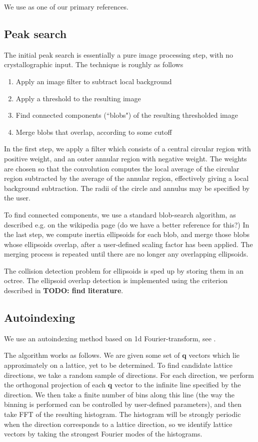 \documentclass[11pt,a4paper]{article}
\def\v#1{\bm{{#1}}}
\def\q{{\v{q}}}
\begin{document}
We use \cite{BuGG16} as one of our primary references.


\subsection{Peak search} \label{peak-search}

The initial peak search is essentially a pure image processing step, with no crystallographic
input. The technique is roughly as follows
\begin{enumerate}
  \item Apply an image filter to subtract local background
  \item Apply a threshold to the resulting image
  \item Find connected components (``blobs") of the resulting thresholded image
  \item Merge blobs that overlap, according to some cutoff
\end{enumerate}

In the first step, we apply a filter which consists of a central circular region with positive weight,
and an outer annular region with negative weight. The weights are chosen so that the convolution
computes the local average of the circular region subtracted by the average of the annular region,
effectively giving a local background subtraction. The radii of the circle and annulus may be
specified by the user.

To find connected components, we use a standard blob-search algorithm, as described e.g. on the
wikipedia page (do we have a better reference for this?) In the last step, we compute inertia
ellipsoids for each blob, and merge those blobs whose ellipsoids overlap, after a user-defined
scaling factor has been applied. The merging process is repeated until there are no longer any
overlapping ellipsoids.

The collision detection problem for ellipsoids is sped up by storing them in an octree. The
ellipsoid overlap detection is implemented using the criterion described in
\textbf{TODO: find literature}.


\subsection{Autoindexing} \label{autoindex}

We use an autoindexing method based on 1d Fourier-transform, see \cite{StBR97,SaGA04}.

The algorithm works as follows. We are given some set of $\q$ vectors which lie approximately on
a lattice, yet to be determined. To find candidate lattice directions, we take a random sample of
directions. For each direction, we perform the orthogonal projection of each $\q$ vector to the
infinite line specified by the direction. We then take a finite number of bins along this line
(the way the binning is performed can be controlled by user-defined parameters), and then take
FFT of the resulting histogram. The histogram will be strongly periodic when the direction corresponds
to a lattice direction, so we identify lattice vectors by taking the strongest Fourier modes of
the histograms.
\end{document}
